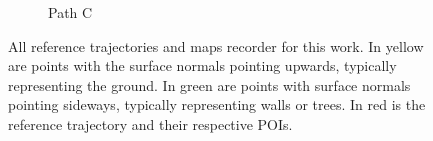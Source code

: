 \begin{figure}[htpb]
\begin{center}
\begin{subfigure}[b]{0.32\textwidth}
			\label{fig:ltr_c}
			\caption{Path C}
		\end{subfigure}%
		\caption{All reference trajectories and maps recorder for this work.
		In yellow are points with the surface normals pointing upwards, typically representing the ground.
		In green are points with surface normals pointing sideways, typically representing walls or trees.
		In red is the reference trajectory and their respective \acp{POI}.} 
		\label{fig:forest}
	\end{center}
\end{figure}



\lightlipsum[1]